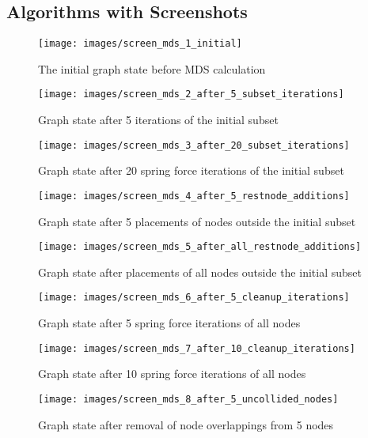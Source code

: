 \subsection{Algorithms with Screenshots}

\begin{figure}[H]
  \centering
    \texttt{[image: images/screen\_mds\_1\_initial]}
  \caption{The initial graph state before MDS calculation}
\end{figure}

\begin{figure}[H]
  \centering
    \texttt{[image: images/screen\_mds\_2\_after\_5\_subset\_iterations]}
  \caption{Graph state after 5 iterations of the initial subset}
\end{figure}

\begin{figure}[H]
  \centering
    \texttt{[image: images/screen\_mds\_3\_after\_20\_subset\_iterations]}
  \caption{Graph state after 20 spring force iterations of the initial subset}
\end{figure}

\begin{figure}[H]
  \centering
    \texttt{[image: images/screen\_mds\_4\_after\_5\_restnode\_additions]}
  \caption{Graph state after 5 placements of nodes outside the initial subset}
\end{figure}

\begin{figure}[H]
  \centering
    \texttt{[image: images/screen\_mds\_5\_after\_all\_restnode\_additions]}
  \caption{Graph state after placements of all nodes outside the initial subset}
\end{figure}

\begin{figure}[H]
  \centering
    \texttt{[image: images/screen\_mds\_6\_after\_5\_cleanup\_iterations]}
  \caption{Graph state after 5 spring force iterations of all nodes}
\end{figure}

\begin{figure}[H]
  \centering
    \texttt{[image: images/screen\_mds\_7\_after\_10\_cleanup\_iterations]}
  \caption{Graph state after 10 spring force iterations of all nodes}
\end{figure}

\begin{figure}[H]
  \centering
    \texttt{[image: images/screen\_mds\_8\_after\_5\_uncollided\_nodes]}
  \caption{Graph state after removal of node overlappings from 5 nodes}
\end{figure}

